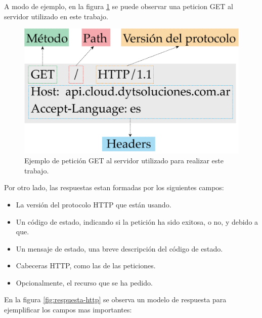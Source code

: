 A modo de ejemplo, en la figura \ref{fig:peticiones-http}  se puede observar una peticion GET al servidor utilizado en este trabajo.

\begin{figure}[htpb]
	\centering
	\includegraphics[scale=.50]{./Figures/peticion-http.png}
	\caption[Petición GET al servidor ]{Ejemplo de petición GET al servidor utilizado para realizar este trabajo.}
	\label{fig:peticiones-http}
\end{figure}


Por otro lado, las respuestas estan formadas por los siguientes campos:

\begin{itemize}
	\item La versión del protocolo HTTP que están usando.
	
	\item Un código de estado, indicando si la petición ha sido exitosa, o no, y debido a que.
	
	\item Un mensaje de estado, una breve descripción del código de estado.
	
	\item Cabeceras HTTP, como las de las peticiones.
	
	\item Opcionalmente, el recurso que se ha pedido.
	
\end{itemize}

En la figura \ref{fig:respuesta-http}  se observa un modelo de respuesta para ejemplificar los campos mas importantes: 

